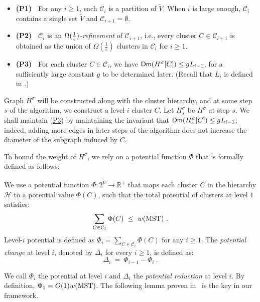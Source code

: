 \begin{itemize}  [noitemsep] 	
	\item \textbf{(P1)~} 	\hypertarget{P1}{} For any $i\geq 1$, each $\mathcal{C}_i$ is a partition of $\tilde{V}$. When $i$ is large enough, $\mathcal{C}_i$ contains a single set $\tilde{V}$ and $\mathcal{C}_{i+1} = \emptyset$.
	\item \textbf{(P2)~} \hypertarget{P2}{} $\mathcal{C}_i$ is an \emph{$\Omega(\frac{1}{\epsilon})$-refinement} of $\mathcal{C}_{i+1}$, i.e., every cluster $C\in \mathcal{C}_{i+1}$ is obtained as the union of $\Omega(\frac{1}{\epsilon})$ clusters in $\mathcal{C}_i$ for $i\geq 1$.
	\item \textbf{(P3)~} \hypertarget{P3}{} For each cluster $C\in \mathcal{C}_i$, we have $\mathsf{Dm}(H^{\sigma}[C]) \leq g L_{i-1}$, for a sufficiently large constant $g$ to be determined later. (Recall that $L_i$ is defined in .) 
\end{itemize}

Graph $H^{\sigma}$ will be constructed along with the cluster hierarchy, and at some step $s$ of the algorithm, we construct a level-$i$ cluster $C$. Let $H^{\sigma}_s$ be $H^{\sigma}$ at step $s$. We shall maintain (\hyperlink{P3}{P3}) by maintaining the invariant that $\mathsf{Dm}(H^{\sigma}_s[C]) \leq g L_{i-1}$; indeed,  adding more edges in later steps of the algorithm does not increase the diameter of the subgraph induced by $C$. 

To bound the weight of $H^{\sigma}$, we rely on a potential function $\Phi$ that is formally defined as follows:

\begin{definition}\label{def:Potential}  We use a potential function $\Phi: 2^{\tilde{V}}\rightarrow \mathbb{R}^+$ that maps each cluster $C$ in the hierarchy $\mathcal{H}$ to a potential value $\Phi(C)$, such that the total potential of clusters at level $1$ satisfies:
	\begin{equation}\label{eq:Phi1}
		\sum_{C\in\mathcal{C}_1}\Phi(C) ~\leq~ w(\operatorname{\mathrm{MST}})~.
	\end{equation}
	Level-$i$ potential is defined as $\Phi_i = \sum_{C\in \mathcal{C}_i} \Phi(C)$ for any $i\geq 1$. The \emph{potential change} at level $i$, denoted by $\Delta_i$ for every $i \geq 1$, is defined as:
	\begin{equation}\label{eq:PotentialReduction}
		\Delta_i ~=~ \Phi_{i-1} - \Phi_{i}~. 
	\end{equation}
\end{definition} 
We call $\Phi_i$ the potential at level $i$ and $\Delta_i$ the \emph{potential reduction} at level $i$. By definition, $\Phi_1 = O(1)w(\operatorname{\mathrm{MST}})$. The following lemma proven in~\cite{LS21} is the key in our framework.


